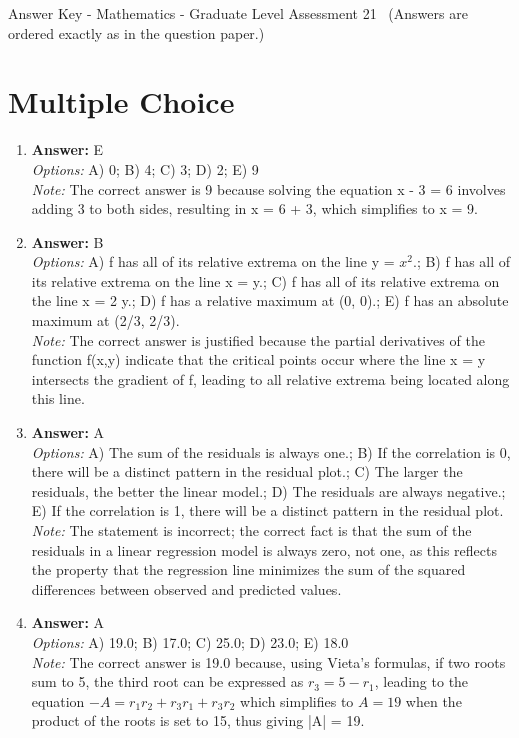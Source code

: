 \documentclass[12pt]{article}
\begin{document}
\begin{center}
Answer Key - Mathematics - Graduate Level Assessment 21 \
\small (Answers are ordered exactly as in the question paper.)
\end{center}

\section*{Multiple Choice}
\begin{enumerate}[label=\arabic*.]
\item \textbf{Answer:} E
\\ \textit{Options:} A) 0; B) 4; C) 3; D) 2; E) 9
\\ \textit{Note:} The correct answer is 9 because solving the equation x - 3 = 6 involves adding 3 to both sides, resulting in x = 6 + 3, which simplifies to x = 9.
\item \textbf{Answer:} B
\\ \textit{Options:} A) f has all of its relative extrema on the line y = $x^2$.; B) f has all of its relative extrema on the line x = y.; C) f has all of its relative extrema on the line x = 2 y.; D) f has a relative maximum at (0, 0).; E) f has an absolute maximum at (2/3, 2/3).
\\ \textit{Note:} The correct answer is justified because the partial derivatives of the function f(x,y) indicate that the critical points occur where the line x = y intersects the gradient of f, leading to all relative extrema being located along this line.
\item \textbf{Answer:} A
\\ \textit{Options:} A) The sum of the residuals is always one.; B) If the correlation is 0, there will be a distinct pattern in the residual plot.; C) The larger the residuals, the better the linear model.; D) The residuals are always negative.; E) If the correlation is 1, there will be a distinct pattern in the residual plot.
\\ \textit{Note:} The statement is incorrect; the correct fact is that the sum of the residuals in a linear regression model is always zero, not one, as this reflects the property that the regression line minimizes the sum of the squared differences between observed and predicted values.
\item \textbf{Answer:} A
\\ \textit{Options:} A) 19.0; B) 17.0; C) 25.0; D) 23.0; E) 18.0
\\ \textit{Note:} The correct answer is 19.0 because, using Vieta's formulas, if two roots sum to 5, the third root can be expressed as \( r_3 = 5 - r_1 \), leading to the equation \( -A = r_1 r_2 + r_3 r_1 + r_3 r_2 \) which simplifies to \( A = 19 \) when the product of the roots is set to 15, thus giving |A| = 19.

\end{enumerate}
\end{document}

